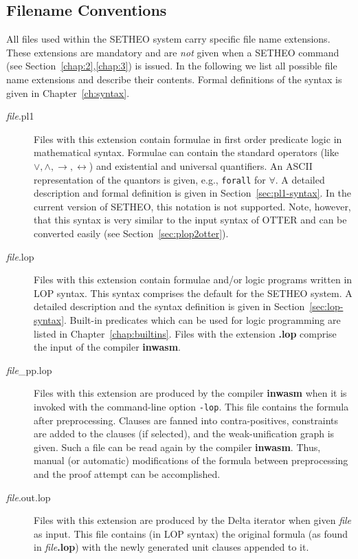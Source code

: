 \subsection{Filename Conventions}

All files used within the SETHEO system carry specific file name
extensions. These extensions are mandatory and are {\em not} given
when a SETHEO command (see Section~\ref{chap:2},\ref{chap:3})
is issued.
In the following we list all possible file name extensions and describe
their contents. Formal definitions of the syntax is given in 
Chapter~\ref{ch:syntax}.

\begin{description}
\item[{\em file}.pl1]
Files with this extension contain formulae in first order predicate
logic in mathematical syntax. Formulae can contain the standard
operators (like $\vee, \wedge,\rightarrow,\leftrightarrow$) and
existential and universal quantifiers. An ASCII representation
of the quantors is given, e.g., {\tt forall} for $\forall$.
A detailed description and formal definition is given in
Section~\ref{sec:pl1-syntax}.
In the current version of SETHEO, this notation is not supported.
Note, however, that this syntax is very similar to the input syntax
of OTTER and can be converted easily (see Section~\ref{sec:plop2otter}).

\item[{\em file}.lop]
Files with this extension contain formulae and/or logic programs
written in LOP syntax. This syntax comprises the default for the
SETHEO system.
A detailed description and the syntax definition is given in
Section~\ref{sec:lop-syntax}. Built-in predicates which can be used
for logic programming are listed in Chapter~\ref{chap:builtins}.
Files with the extension {\bf .lop} comprise the input of the compiler
{\bf inwasm}.

\item[{\em file}\_pp.lop]
Files with this extension are produced by the compiler {\bf inwasm}
when it is invoked with the command-line option {\tt -lop}.
This file contains the formula after preprocessing. Clauses are fanned
into contra-positives, constraints are added to the clauses
(if selected), and the weak-unification graph is given.
Such a file can be read again by the compiler {\bf inwasm}.
Thus, manual (or automatic) modifications of the formula between
preprocessing and the proof attempt can be accomplished.

\item[{\em file}.out.lop]
Files with this extension are produced by the {\sc Delta} iterator
when given {\em file\/} as input.
This file contains (in LOP syntax) the original formula (as found
in {\em file\/}{\bf .lop}) with the newly generated unit clauses
appended to it.


\end{description}
